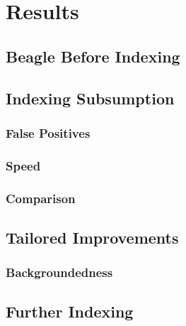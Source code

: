
\chapter{Results}
\label{cha:results}

\section{Beagle Before Indexing}
\label{sec:preindexing}


\section{Indexing Subsumption}
\label{sec:indexresults}

\subsection{False Positives}

\subsection{Speed}

\subsection{Comparison}

\section{Tailored Improvements}
\label{sec:tailresults}

\subsection{Backgroundedness}

\section{Further Indexing}


